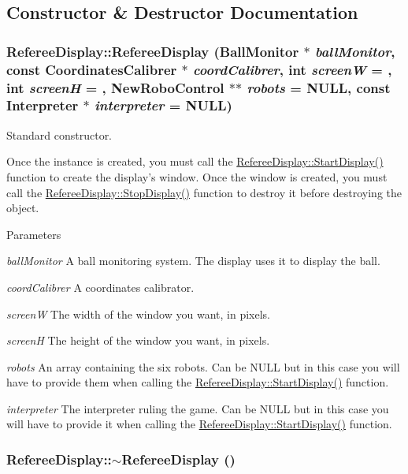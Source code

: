 \subsection{Constructor \& Destructor Documentation}
\hypertarget{classRefereeDisplay_a8f7d4872a24b44b96a36a5bbf991f5d2}{
\subsubsection[{RefereeDisplay}]{\setlength{\rightskip}{0pt plus 5cm}RefereeDisplay::RefereeDisplay ({\bf BallMonitor} $\ast$ {\em ballMonitor}, \/  const {\bf CoordinatesCalibrer} $\ast$ {\em coordCalibrer}, \/  int {\em screenW} = {}, \/  int {\em screenH} = {}, \/  {\bf NewRoboControl} $\ast$$\ast$ {\em robots} = {\ttfamily NULL}, \/  const {\bf Interpreter} $\ast$ {\em interpreter} = {\ttfamily NULL})}}
\label{classRefereeDisplay_a8f7d4872a24b44b96a36a5bbf991f5d2}


Standard constructor. 

Once the instance is created, you must call the \hyperlink{classRefereeDisplay_a6b789ef1ca73c72556cf5051a8a2b5a6}{RefereeDisplay::StartDisplay()} function to create the display's window. Once the window is created, you must call the \hyperlink{classRefereeDisplay_aafa710132ce88c4e6cb4d430baf26173}{RefereeDisplay::StopDisplay()} function to destroy it before destroying the object.


\begin{DoxyParams}{Parameters}
\item[{\em ballMonitor}]A ball monitoring system. The display uses it to display the ball. \item[{\em coordCalibrer}]A coordinates calibrator. \item[{\em screenW}]The width of the window you want, in pixels. \item[{\em screenH}]The height of the window you want, in pixels. \item[{\em robots}]An array containing the six robots. Can be NULL but in this case you will have to provide them when calling the \hyperlink{classRefereeDisplay_a6b789ef1ca73c72556cf5051a8a2b5a6}{RefereeDisplay::StartDisplay()} function. \item[{\em interpreter}]The interpreter ruling the game. Can be NULL but in this case you will have to provide it when calling the \hyperlink{classRefereeDisplay_a6b789ef1ca73c72556cf5051a8a2b5a6}{RefereeDisplay::StartDisplay()} function. \end{DoxyParams}
\hypertarget{classRefereeDisplay_a5a9191c0d7f937df62ea9544d9e38f3b}{
\subsubsection[{$\sim$RefereeDisplay}]{\setlength{\rightskip}{0pt plus 5cm}RefereeDisplay::$\sim$RefereeDisplay ()}}
\label{classRefereeDisplay_a5a9191c0d7f937df62ea9544d9e38f3b}


